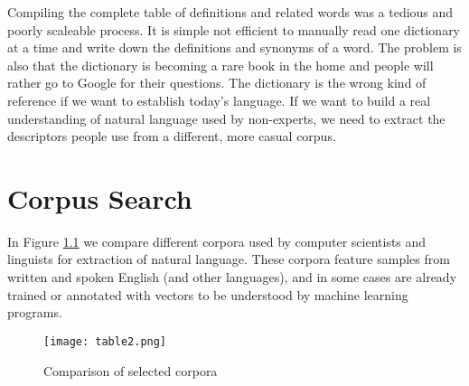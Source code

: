 \documentclass[12pt, usenames, dvipsnames]{report}
\begin{document}
\begin{flushleft}
Compiling the complete table of definitions and related words was a tedious and poorly scaleable process.
It is simple not efficient to manually read one dictionary at a time and write down the definitions and synonyms of a word.
The problem is also that the dictionary is becoming a rare book in the home and people will rather go to Google for their questions.
The dictionary is the wrong kind of reference if we want to establish today’s language.
If we want to build a real understanding of natural language used by non-experts, we need to extract the descriptors people use from a different, more casual corpus.


\chapter{Corpus Search}

In Figure \ref{fig:table2} we compare different corpora used by computer scientists and linguists for extraction of natural language.
These corpora feature samples from written and spoken English (and other languages), and in some cases are already trained or annotated with vectors to be understood by machine learning programs.

\vspace*{1.2em}
\begin{figure}[!htbp]
  \hspace*{-3.666em}
  \texttt{[image: table2.png]}
  \caption{Comparison of selected corpora}
  \label{fig:table2}
\end{figure}
\vspace*{1.2em}


\end{flushleft}
\end{document}
